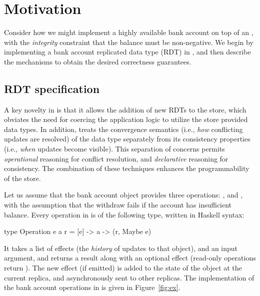 \section{Motivation}
\label{sec:motivation}

Consider how we might implement a highly available bank account on top of an
\ecds, with the \emph{integrity} constraint that the balance must be
non-negative. We begin by implementing a bank account replicated data type
(RDT) in \name, and then describe the mechanisms to obtain the desired
correctness guarantees.

\subsection{RDT specification}

A key novelty in \name is that it allows the addition of new RDTs to the store,
which obviates the need for coercing the application logic to utilize the store
provided data types. In addition, \name treats the convergence semantics (i.e.,
\emph{how} conflicting updates are resolved) of the data type separately from
its consistency properties (i.e., \emph{when} updates become visible). This
separation of concerns permits \emph{operational} reasoning for conflict
resolution, and \emph{declarative} reasoning for consistency. The combination
of these techniques enhances the programmability of the store.

Let us assume that the bank account object provides three operations:
,  and , with the assumption that the
withdraw fails if the account has insufficient balance. Every operation in
\name is of the following type, written in Haskell syntax:

\begin{codehaskell}
type Operation e a r = [e] -> a -> (r, Maybe e)
\end{codehaskell}

\noindent It takes a list of effects (the \emph{history} of updates to that
object), and an input argument, and returns a result along with an optional
effect (read-only operations return ). The new effect (if emitted)
is added to the state of the object at the current replica, and asynchronously
sent to other replicas. The implementation of the bank account operations in
\name is given in Figure~\ref{fig:ex}.

